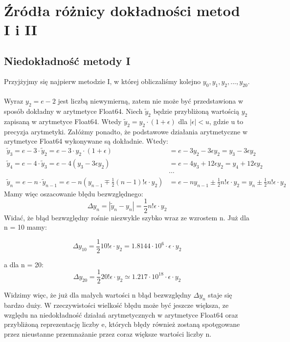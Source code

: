 \documentclass[11pt,wide]{article}
\begin{document}
\section{Źródła różnicy dokładności metod I i II}
\subsection{Niedokładność metody I}
Przyjżyjmy się najpierw metodzie I, w której obliczaliśmy kolejno \(y_0, y_1, y_2, ..., y_{20}\).\\ \\
Wyraz \(y_2 = e - 2\) jest liczbą niewymierną, zatem nie może być przedstawiona w sposób dokładny w arytmetyce Float64. Niech \(\tilde{y}_2\) będzie przybliżoną wartością \(y_2\) zapisaną w arytmetyce Float64. Wtedy \(\tilde{y}_2 = y_2 \cdot (1+\epsilon)\) dla \(|\epsilon|<u\), gdzie u to precyzja arytmetyki. Załóżmy ponadto, że podstawowe działania arytmetyczne w arytmetyce Float64 wykonywane są dokładnie. Wtedy:
\begin{align*} 
\tilde{y}_3 = e - 3 \cdot \tilde{y}_2  = e - 3 \cdot y_2 \cdot (1+\epsilon) &= e - 3 y_2 - 3 \epsilon y_2 = y_3 - 3 \epsilon y_2\\ 
\tilde{y}_4 = e - 4 \cdot \tilde{y}_3 = e - 4 (y_3 - 3 \epsilon y_2) &= e - 4 y_3 + 12 \epsilon y_2 = y_4 + 12 \epsilon y_2 \\
&\cdots \\
\tilde{y}_n = e - n \cdot \tilde{y}_{n-1} = e - n (y_{n-1} \mp  \frac{1}{2} (n-1)! \epsilon \cdot y_2) &= 
e - n y_{n-1} \pm \frac{1}{2} n! \epsilon \cdot y_2 = y_n \pm \frac{1}{2} n! \epsilon \cdot y_2
\end{align*}
Mamy więc oszacowanie błędu bezwzględnego:
\begin{equation}
\Delta y_n = |\tilde{y}_n - y_n| = \frac{1}{2} n! \epsilon \cdot y_2
\end{equation}
Widać, że błąd bezwzględny rośnie niezwykle szybko wraz ze wzrostem n. Już dla n = 10 mamy:

\begin{equation}
\Delta y_{10} = \frac{1}{2} 10! \epsilon \cdot y_2 = 1. 8144 \cdot 10^{6} \cdot \epsilon \cdot y_2
\end{equation}

a dla n = 20:
\begin{equation}
\Delta y_{20} = \frac{1}{2} 20! \epsilon \cdot y_2 \simeq 1.217 \cdot 10^{18} \cdot \epsilon \cdot y_2
\end{equation}

Widzimy więc, że już dla małych wartości n błąd bezwzględny \(\Delta y_n\) staje się bardzo duży. W rzeczywistości wielkość błędu może być jeszcze większa, ze względu na niedokładność działań arytmetycznych w arytmetyce Float64 oraz przybliżoną reprezentację liczby e, których błędy również zostaną spotęgowane przez nieustanne przemnażanie przez coraz większe wartości liczby n.\\ \\
\end{document}
